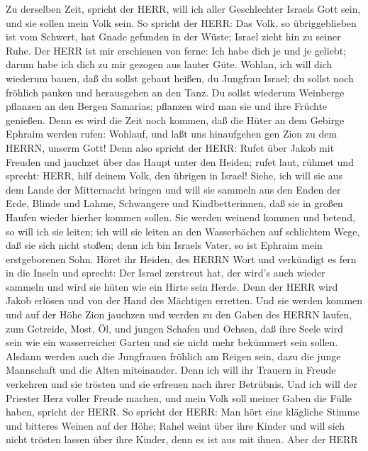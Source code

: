  Zu derselben Zeit, spricht der HERR, will ich aller
Geschlechter Israels Gott sein, und sie sollen mein Volk sein.
 So spricht der HERR: Das Volk, so übriggeblieben ist vom
Schwert, hat Gnade gefunden in der Wüste; Israel zieht hin zu seiner
Ruhe.  Der HERR ist mir erschienen von ferne: Ich habe dich
je und je geliebt; darum habe ich dich zu mir gezogen aus lauter Güte.
 Wohlan, ich will dich wiederum bauen, daß du sollst gebaut
heißen, du Jungfrau Israel; du sollst noch fröhlich pauken und
herausgehen an den Tanz.  Du sollst wiederum Weinberge
pflanzen an den Bergen Samarias; pflanzen wird man sie und ihre Früchte
genießen.  Denn es wird die Zeit noch kommen, daß die Hüter
an dem Gebirge Ephraim werden rufen: Wohlauf, und laßt uns hinaufgehen
gen Zion zu dem HERRN, unserm Gott!  Denn also spricht der
HERR: Rufet über Jakob mit Freuden und jauchzet über das Haupt unter den
Heiden; rufet laut, rühmet und sprecht: HERR, hilf deinem Volk, den
übrigen in Israel!  Siehe, ich will sie aus dem Lande der
Mitternacht bringen und will sie sammeln aus den Enden der Erde, Blinde
und Lahme, Schwangere und Kindbetterinnen, daß sie in großen Haufen
wieder hierher kommen sollen.  Sie werden weinend kommen und
betend, so will ich sie leiten; ich will sie leiten an den Wasserbächen
auf schlichtem Wege, daß sie sich nicht stoßen; denn ich bin Israels
Vater, so ist Ephraim mein erstgeborenen Sohn.  Höret ihr
Heiden, des HERRN Wort und verkündigt es fern in die Inseln und sprecht:
Der Israel zerstreut hat, der wird's auch wieder sammeln und wird sie
hüten wie ein Hirte sein Herde.  Denn der HERR wird Jakob
erlösen und von der Hand des Mächtigen erretten.  Und sie
werden kommen und auf der Höhe Zion jauchzen und werden zu den Gaben des
HERRN laufen, zum Getreide, Most, Öl, und jungen Schafen und Ochsen, daß
ihre Seele wird sein wie ein wasserreicher Garten und sie nicht mehr
bekümmert sein sollen.  Alsdann werden auch die Jungfrauen
fröhlich am Reigen sein, dazu die junge Mannschaft und die Alten
miteinander. Denn ich will ihr Trauern in Freude verkehren und sie
trösten und sie erfreuen nach ihrer Betrübnis.  Und ich
will der Priester Herz voller Freude machen, und mein Volk soll meiner
Gaben die Fülle haben, spricht der HERR.  So spricht der
HERR: Man hört eine klägliche Stimme und bitteres Weinen auf der Höhe;
Rahel weint über ihre Kinder und will sich nicht trösten lassen über
ihre Kinder, denn es ist aus mit ihnen.  Aber der HERR
